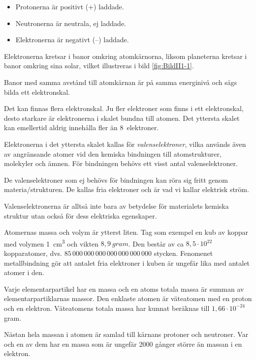 \begin{itemize}
	\item Protonerna är positivt (+) laddade.
	\item Neutronerna är neutrala, ej laddade.
	\item Elektronerna är negativt (--) laddade.
\end{itemize}


Elektronerna kretsar i banor omkring atomkärnorna, liksom
planeterna kretsar i banor omkring sina solar, vilket illustreras i bild
\ref{fig:BildII1-1}.

Banor med samma avstånd till atomkärnan är på samma energinivå och sägs bilda
ett elektronskal.

Det kan finnas flera elektronskal.
Ju fler elektroner som finns i ett elektronskal, desto starkare är elektronerna
i skalet bundna till atomen.
Det yttersta skalet kan emellertid aldrig innehålla fler än 8~elektroner.

Elektronerna i det yttersta skalet kallas för \emph{valenselektroner}, vilka
används även av angränsande atomer vid den kemiska bindningen till
atomstrukturer, molekyler och ämnen.
För bindningen behövs ett visst antal valenselektroner.

De valenselektroner som ej behövs för bindningen kan röra sig fritt genom
materia/strukturen.
De kallas fria elektroner och är vad vi kallar elektrisk ström.

Valenselektronerna är alltså inte bara av betydelse för materialets kemiska
struktur utan också för dess elektriska egenskaper.

Atomernas massa och volym är ytterst liten.
Tag som exempel en kub av koppar med volymen \SI{1}{\cubic\centi\metre} och vikten
\(8,9\ gram\).
Den består av ca \(8,5 \cdot 10^{22}\) kopparatomer, dvs.
\(85\, 000\, 000\, 000\, 000\, 000\, 000\, 000\) stycken.
Fenomenet metallbindning gör att antalet fria elektroner i kuben är ungefär lika
med antalet atomer i den.

Varje elementarpartikel har en massa och en atoms totala massa är summan av
elementarpartiklarnas massor.
Den enklaste atomen är väteatomen med en proton och en elektron.
Väteatomens totala massa har kunnat beräknas till \(1,66 \cdot 10^{-24}\) gram.

Nästan hela massan i atomen är samlad till kärnans protoner och neutroner.
Var och en av dem har en massa som är ungefär 2000 gånger större än massan i en
elektron.

